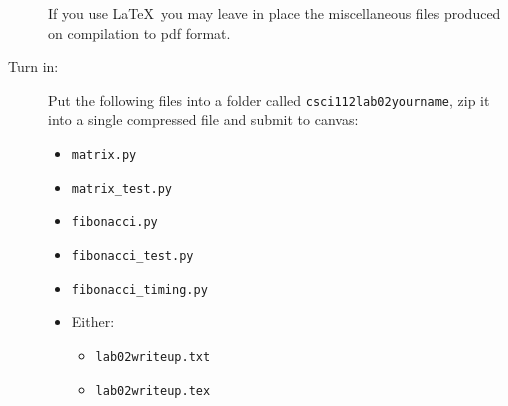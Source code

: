 \documentclass{article}
\newcommand{\bi}{\begin{itemize}}
\newcommand{\li}{\item}
\newcommand{\ei}{\end{itemize}}
\begin{document}
\begin{description}
 If you use \LaTeX\ you may leave in place the miscellaneous
 files produced on compilation to pdf format. 
 
 \item[Turn in:] Put the following files into a folder called {\tt csci112lab02yourname},
 zip it into a single compressed file and submit to canvas:

\bi
\li \lstinline{matrix.py}
\li \lstinline{matrix_test.py}
\li \lstinline{fibonacci.py}
\li \lstinline{fibonacci_test.py}
\li \lstinline{fibonacci_timing.py}
\li Either:
\bi
\li \lstinline{lab02writeup.txt}
\li \lstinline{lab02writeup.tex}
\ei
\ei
 


\end{description}
\end{document}
